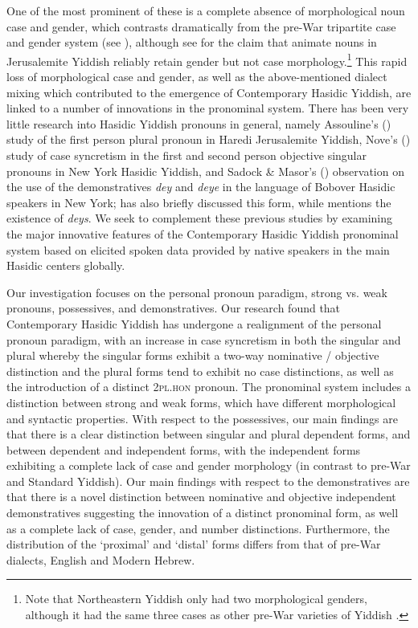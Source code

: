 \documentclass[output=paper, hidelinks]{langscibook}
\begin{document}
One of the most prominent of these is a complete absence of morphological noun case and gender, which contrasts dramatically from the pre-War tripartite case and gender system (see \citealt{Author20, Author21}), although see \citet{Assouline14} for the claim that animate nouns in Jerusalemite Yiddish reliably retain gender but not case morphology.\footnote{Note that Northeastern Yiddish only had two morphological genders, although it had the same three cases as other pre-War varieties of Yiddish \citep{Jacobs90}.} This rapid loss of morphological case and gender, as well as the above-mentioned dialect mixing which contributed to the emergence of Contemporary Hasidic Yiddish, are linked to a number of innovations in the pronominal system. There has been very little research into Hasidic Yiddish pronouns in general, namely Assouline’s (\citeyear{Assouline10}) study of the first person plural pronoun in Haredi Jerusalemite Yiddish, Nove's (\citeyear{Nove18}) study of case syncretism in the first and second person objective singular pronouns in New York Hasidic Yiddish, and Sadock \& Masor’s (\citeyear[95, 103]{Sadock18}) observation on the use of the demonstratives \textit{dey} and \textit{deye} in the language of Bobover Hasidic speakers in New York; \citet{Assouline14} has also briefly discussed this form, while \citet{Krogh12} mentions the existence of \textit{deys}. We seek to complement these previous studies by examining the major innovative features of the Contemporary Hasidic Yiddish pronominal system based on elicited spoken data provided by native speakers in the main Hasidic centers globally. 

Our investigation focuses on the personal pronoun paradigm, strong vs. weak pronouns, possessives, and demonstratives. Our research found that Contemporary Hasidic Yiddish has undergone a realignment of the personal pronoun paradigm, with an increase in case syncretism in both the singular and plural whereby the singular forms exhibit a two-way nominative / objective distinction and the plural forms tend to exhibit no case distinctions, as well as the introduction of a distinct 2\textsc{pl.hon} pronoun. The pronominal system includes a distinction between strong and weak forms, which have different morphological and syntactic properties. With respect to the possessives, our main findings are that there is a clear distinction between singular and plural dependent forms, and between dependent and independent forms, with the independent forms exhibiting a complete lack of case and gender morphology (in contrast to pre-War and Standard Yiddish). Our main findings with respect to the demonstratives are that there is a novel distinction between nominative and objective independent demonstratives suggesting the innovation of a distinct pronominal form, as well as a complete lack of case, gender, and number distinctions. Furthermore, the distribution of the `proximal' and `distal' forms differs from that of pre-War dialects, English and Modern Hebrew.
\end{document}
